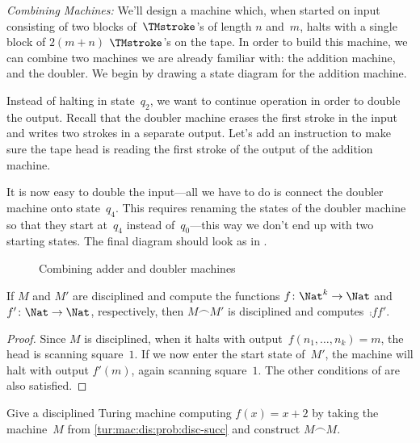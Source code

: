 \documentclass[../../../include/open-logic-section]{subfiles}
\begin{document}
\begin{ex}
\emph{Combining Machines:} We'll design a machine which, when started
on input consisting of two blocks of~$\TMstroke$'s of length $n$
and~$m$, halts with a single block of $2(m+n)$ $\TMstroke$'s on the
tape. In order to build this machine, we can combine two machines we
are already familiar with: the addition machine, and the doubler. We
begin by drawing a state diagram for the addition machine.
\begin{center}
\end{center}
Instead of halting in state~$q_2$, we want to continue operation in
order to double the output. Recall that the doubler machine erases the
first stroke in the input and writes two strokes in a separate output.
Let's add an instruction to make sure the tape head is reading the
first stroke of the output of the addition machine.
\begin{center}
\end{center}
It is now easy to double the input---all we have to do is connect the
doubler machine onto state~$q_4$. This requires renaming the states of
the doubler machine so that they start at~$q_4$ instead
of~$q_0$---this way we don't end up with two starting states. The
final diagram should look as in .
\begin{figure}
\centering
\caption{Combining adder and doubler machines}
\end{figure}
\end{ex}

\begin{prop}
    If $M$ and $M'$ are disciplined and compute the functions $f\colon
    \Nat^k \to \Nat$ and $f'\colon \Nat \to \Nat$, respectively, then
    $M \frown M'$ is disciplined and computes~$\comp{f}{f'}$.
\end{prop}

\begin{proof}
    Since $M$ is disciplined, when it halts with
    output~$f(n_1,\dots,n_k) = m$, the head is scanning square~$1$. If
    we now enter the start state of~$M'$, the machine will halt with
    output $f'(m)$, again scanning square~$1$. The other conditions of
     are also satisfied.
\end{proof}

\begin{prob}
    Give a disciplined Turing machine computing $f(x) = x+2$ by taking
    the machine~$M$ from \cref{tur:mac:dis:prob:disc-succ} and
    construct $M \frown M$.
\end{prob}
\end{document}
